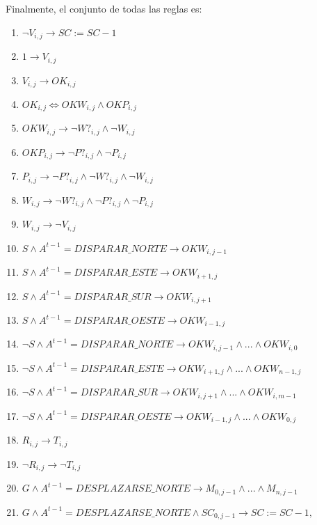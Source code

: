 Finalmente, el conjunto de todas las reglas es:
\begin{enumerate}
    \item $\neg V_{i, j} \longrightarrow SC := SC - 1$
    \item $1 \longrightarrow V_{i, j}$
    \item $V_{i, j} \longrightarrow OK_{i, j}$
    \item $OK_{i, j} \iff OKW_{i, j} \land OKP_{i, j} $
    \item $OKW_{i, j} \longrightarrow \neg W?_{i, j} \land \neg W_{i, j} $
    \item $OKP_{i, j} \longrightarrow \neg P?_{i, j} \land \neg P_{i, j} $
    \item $P_{i, j} \longrightarrow \neg P?_{i, j} \land \neg W?_{i, j} \land \neg W_{i, j}$
    \item $W_{i, j} \longrightarrow \neg W?_{i, j} \land \neg P?_{i, j} \land \neg P_{i, j}$
    \item $W_{i, j} \longrightarrow \neg V_{i, j}$
    \item $ S \land A^{t-1} = DISPARAR\_NORTE \longrightarrow OKW_{i, j-1} $
    \item $ S \land A^{t-1} = DISPARAR\_ESTE \longrightarrow OKW_{i+1, j} $
    \item $ S \land A^{t-1} = DISPARAR\_SUR \longrightarrow OKW_{i, j+1} $
    \item $ S \land A^{t-1} = DISPARAR\_OESTE \longrightarrow OKW_{i-1, j} $
    \item $ \neg S \land A^{t-1} = DISPARAR\_NORTE \longrightarrow OKW_{i, j-1} \land ... \land OKW_{i, 0} $
    \item $ \neg S \land A^{t-1} = DISPARAR\_ESTE \longrightarrow OKW_{i+1, j} \land ... \land OKW_{n-1, j}$
    \item $ \neg S \land A^{t-1} = DISPARAR\_SUR \longrightarrow OKW_{i, j+1}  \land ... \land OKW_{i, m-1}$
    \item $ \neg S \land A^{t-1} = DISPARAR\_OESTE \longrightarrow OKW_{i-1, j} \land ... \land OKW_{0, j}$ 
    \item $R_{i, j} \longrightarrow T_{i, j}$
    \item $\neg R_{i, j} \longrightarrow \neg T_{i, j}$
    \item $G \land A^{t-1} = DESPLAZARSE\_NORTE \longrightarrow M_{0, j-1} \land ... \land M_{n, j-1}$
    \item $G \land A^{t-1} = DESPLAZARSE\_NORTE \land SC_{0, j-1} \longrightarrow SC := SC - 1,$ \newline

\end{enumerate}
